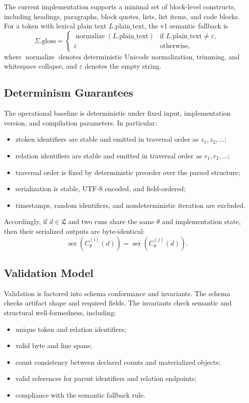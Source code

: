 \documentclass{article}
\newcommand{\Src}{\mathfrak{L}}
\newcommand{\Comp}{C_\theta}
\begin{document}
The current implementation supports a minimal set of block-level constructs, including headings, paragraphs, block quotes, lists, list items, and code blocks. For a token with lexical plain text \(L.\mathrm{plain\_text}\), the v1 semantic fallback is
\[
\Sigma.\mathrm{gloss} =
\begin{cases}
\operatorname{normalize}(L.\mathrm{plain\_text}) & \text{if } L.\mathrm{plain\_text} \neq \varepsilon,\\[4pt]
\varepsilon & \text{otherwise},
\end{cases}
\]
where \(\operatorname{normalize}\) denotes deterministic Unicode normalization, trimming, and whitespace collapse, and \(\varepsilon\) denotes the empty string.

\subsection*{Determinism Guarantees}

The operational baseline is deterministic under fixed input, implementation version, and compilation parameters. In particular:
\begin{itemize}
\item ztoken identifiers are stable and emitted in traversal order as \(z_1, z_2, \dots\);
\item relation identifiers are stable and emitted in traversal order as \(r_1, r_2, \dots\);
\item traversal order is fixed by deterministic preorder over the parsed structure;
\item serialization is stable, UTF-8 encoded, and field-ordered;
\item timestamps, random identifiers, and nondeterministic iteration are excluded.
\end{itemize}

Accordingly, if \(d \in \Src\) and two runs share the same \(\theta\) and implementation state, then their serialized outputs are byte-identical:
\[
\operatorname{ser}(\Comp^{(i)}(d)) = \operatorname{ser}(\Comp^{(j)}(d)).
\]

\subsection*{Validation Model}

Validation is factored into schema conformance and invariants. The schema checks artifact shape and required fields. The invariants check semantic and structural well-formedness, including:
\begin{itemize}
\item unique token and relation identifiers;
\item valid byte and line spans;
\item count consistency between declared counts and materialized objects;
\item valid references for parent identifiers and relation endpoints;
\item compliance with the semantic fallback rule.
\end{itemize}
\end{document}
